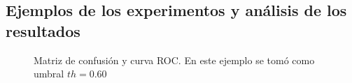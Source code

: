 \subsection{Ejemplos de los experimentos y análisis de los resultados}

\begin{figure}
	\centering
	\caption{Matriz de confusión y curva ROC. En este ejemplo se tomó como umbral $th=0.60$} \label{fig:1d-experiment-060}
\end{figure}

